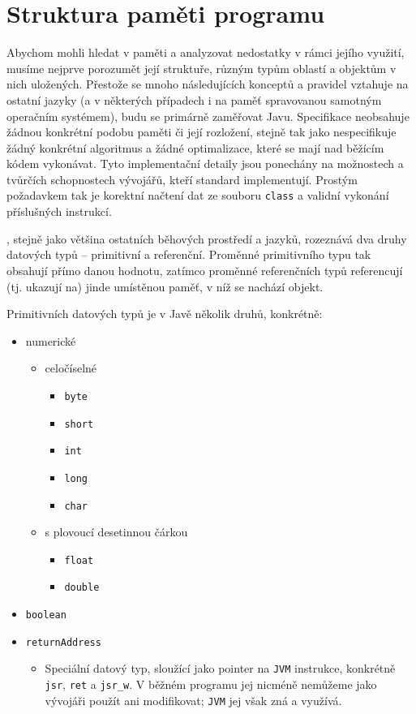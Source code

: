 \chapter{Struktura paměti programu}

Abychom mohli hledat v paměti a analyzovat nedostatky v rámci jejího využití, musíme nejprve porozumět její struktuře, různým typům oblastí a objektům v nich uložených. Přestože se mnoho následujících konceptů a pravidel vztahuje na ostatní jazyky (a v některých případech i na paměť spravovanou samotným operačním systémem), budu se primárně zaměřovat Javu. Specifikace  neobsahuje žádnou konkrétní podobu paměti či její rozložení, stejně tak jako nespecifikuje žádný konkrétní algoritmus  a žádné optimalizace, které se mají nad běžícím kódem vykonávat. Tyto implementační detaily jsou ponechány na možnostech a tvůrčích schopnostech vývojářů, kteří standard implementují. Prostým požadavkem tak je korektní načtení dat ze souboru \texttt{class} a validní vykonání příslušných instrukcí.

, stejně jako většina ostatních běhových prostředí a jazyků, rozeznává dva druhy datových typů -- primitivní a referenční. Proměnné primitivního typu tak obsahují přímo danou hodnotu, zatímco proměnné referenčních typů referencují (tj. ukazují na) jinde umístěnou paměť, v níž se nachází objekt.

Primitivních datových typů je v Javě několik druhů, konkrétně:

\begin{itemize}
	\item numerické
	\begin{itemize}
		\item celočíselné
			\begin{itemize}
				\item \texttt{byte}
				\item \texttt{short}
				\item \texttt{int}
				\item \texttt{long}
				\item \texttt{char}
			\end{itemize}
		\item s plovoucí desetinnou čárkou
			\begin{itemize}
				\item \texttt{float}
				\item \texttt{double}
			\end{itemize}
		\end{itemize}
	\item \texttt{boolean}
	\item \texttt{returnAddress}
		\begin{itemize}
			\item Speciální datový typ, sloužící jako pointer na \texttt{JVM} instrukce, konkrétně \texttt{jsr}, \texttt{ret} a \texttt{jsr\_w}. V běžném programu jej nicméně nemůžeme jako vývojáři použít ani modifikovat; \texttt{JVM} jej však zná a využívá.
		\end{itemize}
\end{itemize}

